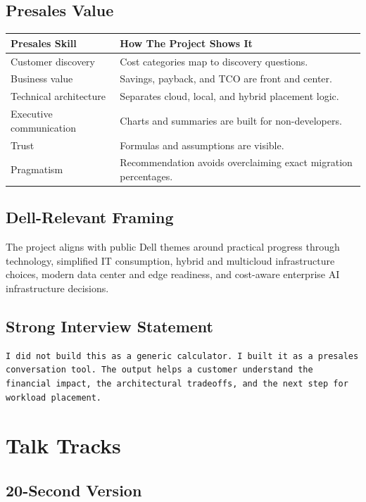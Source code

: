 \documentclass[11pt,a4paper]{article}
\begin{document}
\subsection{Presales Value}

\begin{longtable}{p{}p{}}
\toprule
\textbf{Presales Skill} & \textbf{How The Project Shows It} \\
\midrule
Customer discovery & Cost categories map to discovery questions. \\
Business value & Savings, payback, and TCO are front and center. \\
Technical architecture & Separates cloud, local, and hybrid placement logic. \\
Executive communication & Charts and summaries are built for non-developers. \\
Trust & Formulas and assumptions are visible. \\
Pragmatism & Recommendation avoids overclaiming exact migration percentages. \\
\bottomrule
\end{longtable}

\subsection{Dell-Relevant Framing}

The project aligns with public Dell themes around practical progress through technology, simplified IT consumption, hybrid and multicloud infrastructure choices, modern data center and edge readiness, and cost-aware enterprise AI infrastructure decisions.

\subsection{Strong Interview Statement}

\begin{lstlisting}
I did not build this as a generic calculator. I built it as a presales conversation tool. The output helps a customer understand the financial impact, the architectural tradeoffs, and the next step for workload placement.
\end{lstlisting}

\section{Talk Tracks}

\subsection{20-Second Version}
\end{document}
